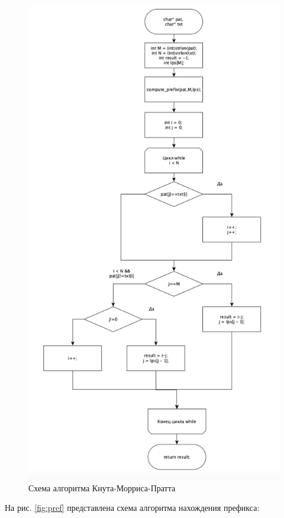 \documentclass[a4paper, 14pt]{report}
\begin{document}
    \begin{figure}[H]
        	\begin{center}
        		\includegraphics[scale=0.65]{img/kmp.png}
        		\caption{Схема алгоритма Кнута-Морриса-Пратта}
        		\label{fig:kmp}
        	\end{center}
        \end{figure}
\newpage
        На рис. \ref{fig:pref} представлена схема алгоритма нахождения префикса:
    
\end{document}
